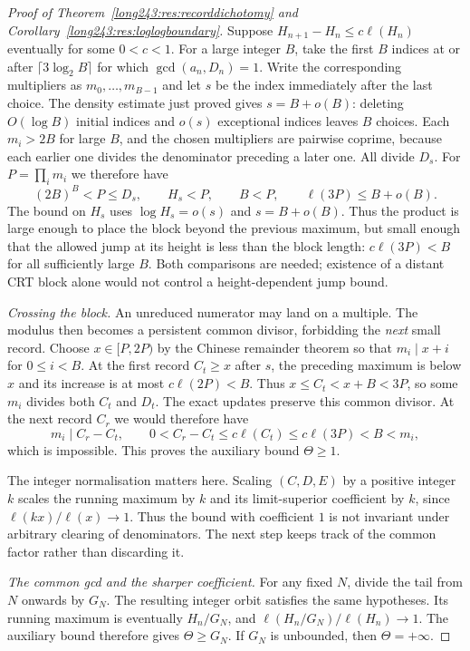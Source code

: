\begin{proof}[Proof of Theorem~\ref{long243:res:recorddichotomy} and
Corollary~\ref{long243:res:loglogboundary}]
Suppose $H_{n+1}-H_n\le c\ell(H_n)$ eventually for some $0<c<1$.
For a large integer $B$, take the first $B$ indices at or after
$\lceil3\log_2B\rceil$ for which $\gcd(a_n,D_n)=1$.
Write the corresponding multipliers as $m_0,\ldots,m_{B-1}$ and let
$s$ be the index immediately after the last choice. The density estimate
just proved gives $s=B+o(B)$: deleting $O(\log B)$ initial indices and
$o(s)$ exceptional indices leaves $B$ choices.
Each $m_i>2B$ for large $B$, and the chosen multipliers are pairwise
coprime, because each earlier one divides the denominator preceding a
later one. All divide $D_s$. For $P=\prod_i m_i$ we therefore have
\[
 (2B)^B<P\le D_s,\qquad H_s<P,\qquad B<P,
 \qquad \ell(3P)\le B+o(B).
\]
The bound on $H_s$ uses $\log H_s=o(s)$ and $s=B+o(B)$.
Thus the product is large enough to place the block beyond the previous
maximum, but small enough that the allowed jump at its height is less
than the block length: $c\ell(3P)<B$ for all sufficiently large $B$.
Both comparisons are needed; existence of a distant CRT block alone
would not control a height-dependent jump bound.

\emph{Crossing the block.}
An unreduced numerator may land on a multiple. The modulus then
becomes a persistent common divisor, forbidding the \emph{next}
small record. Choose $x\in[P,2P)$ by the Chinese remainder theorem so that
$m_i\mid x+i$ for $0\le i<B$. At the first record $C_t\ge x$
after $s$, the preceding maximum is below $x$ and its increase is
at most $c\ell(2P)<B$. Thus
$x\le C_t<x+B<3P$, so some $m_i$ divides both $C_t$ and $D_t$.
The exact updates preserve this common divisor. At the next record
$C_r$ we would therefore have
\[
 m_i\mid C_r-C_t,\qquad
 0<C_r-C_t\le c\ell(C_t)\le c\ell(3P)<B<m_i,
\]
which is impossible. This proves the auxiliary bound $\Theta\ge1$.

The integer normalisation matters here. Scaling $(C,D,E)$ by a positive
integer $k$ scales the running maximum by $k$ and its limit-superior
coefficient by $k$, since $\ell(kx)/\ell(x)\to1$. Thus the bound with
coefficient $1$ is not invariant under arbitrary clearing of denominators.
The next step keeps track of the common factor rather than discarding it.

\emph{The common gcd and the sharper coefficient.}
For any fixed $N$, divide the tail from $N$ onwards by $G_N$.
The resulting integer orbit satisfies the same hypotheses. Its running
maximum is eventually $H_n/G_N$, and
$\ell(H_n/G_N)/\ell(H_n)\to1$. The auxiliary bound therefore gives
$\Theta\ge G_N$. If $G_N$ is unbounded, then $\Theta=+\infty$.


\end{proof}
